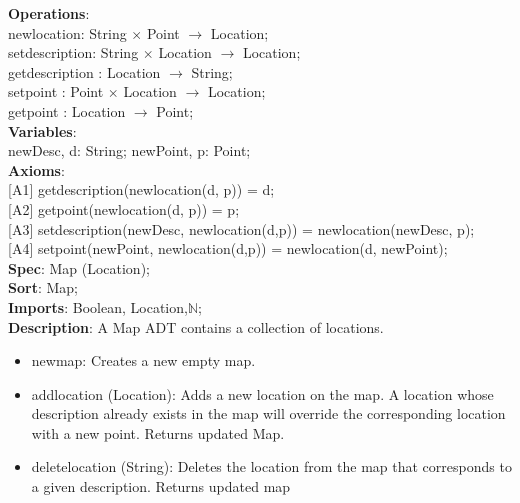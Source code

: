 \documentclass[12pt]{article}
\begin{document}
\begin{spacing}{1.5}
\noindent \textbf{Operations}:\\
\hspace*{5mm} newlocation: String $\times$ Point $\rightarrow$ Location;\\
\hspace*{5mm} setdescription: String $\times$ Location $\rightarrow$ Location;\\
\hspace*{5mm} getdescription : Location $\rightarrow$ String;\\
\hspace*{5mm} setpoint : Point $\times$ Location $\rightarrow$ Location;\\
\hspace*{5mm} getpoint : Location $\rightarrow$ Point;\\
\noindent \textbf{Variables}:\\
\hspace*{5mm} newDesc, d: String; newPoint, p: Point;\\
\noindent \textbf{Axioms}:\\
\hspace*{5mm} [A1] getdescription(newlocation(d, p)) = d;\\
\hspace*{5mm} [A2] getpoint(newlocation(d, p)) = p;\\
\hspace*{5mm} [A3] setdescription(newDesc, newlocation(d,p)) = newlocation(newDesc, p);\\
\hspace*{5mm} [A4] setpoint(newPoint, newlocation(d,p)) = newlocation(d, newPoint);\\
\newpage
\noindent \textbf{Spec}: Map (Location);\\
\noindent \textbf{Sort}: Map;\\
\noindent \textbf{Imports}: Boolean, Location,$\mathbb{N}$;\\
\noindent \textbf{Description}: A Map ADT contains a collection of locations.
\begin{itemize}
	\item newmap: Creates a new empty map.
	\item addlocation (Location): Adds a new location on the map. A location whose description already exists in the map will override the corresponding location with a new
	point.
Returns updated Map.
	\item deletelocation (String): Deletes the location from the map that corresponds to
	a given description. Returns updated map


\end{itemize}
\end{spacing}
\end{document}
